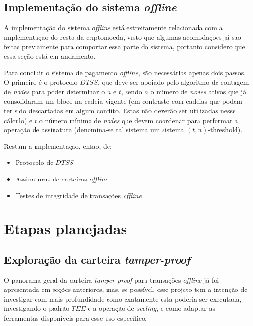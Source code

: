 \documentclass[
  12pt,
  a4paper,
  oneside,
  article,
]{abntex2}
\begin{document}
\subsection{Implementação do sistema \textit{offline}}

A implementação do sistema \textit{offline} está estreitamente relacionada com a implementação do resto da criptomoeda, visto que algumas acomodações já são feitas previamente para comportar essa parte do sistema, portanto considero que essa seção está em andamento.

Para concluir o sistema de pagamento \textit{offline}, são necessários apenas dois passos. O primeiro é o protocolo $DTSS$, que deve ser apoiado pelo algoritmo de contagem de \textit{nodes} para poder determinar o $n$ e $t$, sendo $n$ o número de \textit{nodes} ativos que já consolidaram um bloco na cadeia vigente (em contraste com cadeias que podem ter sido descartadas em algum conflito. Estas não deverão ser utilizadas nesse cálculo) e $t$ o número mínimo de \textit{nodes} que devem coordenar para performar a operação de assinatura (denomina-se tal sistema um sistema $(t, n)$-threshold).

Restam a implementação, então, de:

\begin{itemize}[leftmargin=1.5cm, itemsep=0pt, topsep=2pt]
	\item Protocolo de $DTSS$
	\item Assinaturas de carteiras \textit{offline}
	\item Testes de integridade de transações \textit{offline}
\end{itemize}
% 

\section{Etapas planejadas}

\subsection{Exploração da carteira \textit{tamper-proof}}

O panorama geral da carteira \textit{tamper-proof} para transações \textit{offline} já foi apresentada em seções anteriores, mas, se possível, esse projeto tem a intenção de investigar com mais profundidade como exatamente esta poderia ser executada, investigando o padrão $TEE$ e a operação de \textit{sealing}, e como adaptar as ferramentas disponíveis para esse uso específico.
\end{document}
